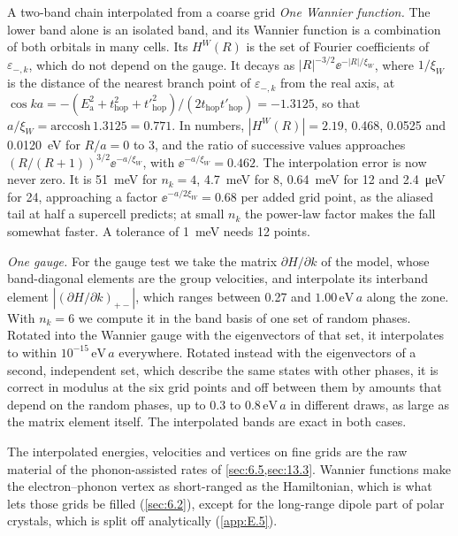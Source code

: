 \begin{workedexample}{A two-band chain interpolated from a coarse grid}
\emph{One Wannier function.} The lower band alone is an isolated band, and its Wannier function is a combination of both orbitals in many cells. Its $H^W(R)$ is the set of Fourier coefficients of $\varepsilon_{-,k}$, which do not depend on the gauge. It decays as $|R|^{-3/2}\ee^{-|R|/\xi_W}$, where $1/\xi_W$ is the distance of the nearest branch point of $\varepsilon_{-,k}$ from the real axis, at $\cos ka = -(E_{\mathrm{a}}^2 + t_{\mathrm{hop}}^2 + t'^2_{\mathrm{hop}})/(2t_{\mathrm{hop}}t'_{\mathrm{hop}}) = -1.3125$, so that $a/\xi_W = \mathrm{arccosh}\,1.3125 = 0.771$. In numbers, $|H^W(R)| = 2.19$, 0.468, 0.0525 and \SI{0.0120}{eV} for $R/a = 0$ to 3, and the ratio of successive values approaches $(R/(R+1))^{3/2}\ee^{-a/\xi_W}$, with $\ee^{-a/\xi_W} = 0.462$. The interpolation error is now never zero. It is \SI{51}{meV} for $n_k = 4$, \SI{4.7}{meV} for 8, \SI{0.64}{meV} for 12 and \SI{2.4}{\micro eV} for 24, approaching a factor $\ee^{-a/2\xi_W} = 0.68$ per added grid point, as the aliased tail at half a supercell predicts; at small $n_k$ the power-law factor makes the fall somewhat faster. A tolerance of \SI{1}{meV} needs 12 points.

\emph{One gauge.} For the gauge test we take the matrix $\partial H/\partial k$ of the model, whose band-diagonal elements are the group velocities, and interpolate its interband element $|(\partial H/\partial k)_{+-}|$, which ranges between 0.27 and $1.00\,\mathrm{eV}\,a$ along the zone. With $n_k = 6$ we compute it in the band basis of one set of random phases. Rotated into the Wannier gauge with the eigenvectors of that set, it interpolates to within $10^{-15}\,\mathrm{eV}\,a$ everywhere. Rotated instead with the eigenvectors of a second, independent set, which describe the same states with other phases, it is correct in modulus at the six grid points and off between them by amounts that depend on the random phases, up to 0.3 to $0.8\,\mathrm{eV}\,a$ in different draws, as large as the matrix element itself. The interpolated bands are exact in both cases.
\end{workedexample}

The interpolated energies, velocities and vertices on fine grids are the raw material of the phonon-assisted rates of \cref{sec:6.5,sec:13.3}. Wannier functions make the electron--phonon vertex as short-ranged as the Hamiltonian, which is what lets those grids be filled (\cref{sec:6.2}), except for the long-range dipole part of polar crystals, which is split off analytically (\cref{app:E.5}).

